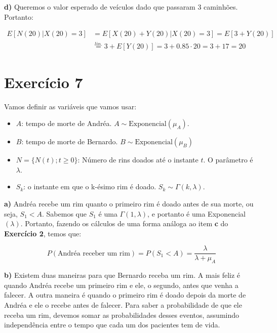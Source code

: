 \documentclass[12pt]{article}
\begin{document}
	 \textbf{d)} Queremos o valor esperado de veículos dado que passaram 3 caminhões. Portanto:
	 
	 \begin{equation*}
		 \begin{split}
			 E[N(20) | X(20) = 3] & = E[X(20) + Y(20) | X(20) = 3] = E[3 + Y(20)] \\
			 & \stackrel{lin.}{=} 3 + E[Y(20)] = 3 + 0.85 \cdot 20 = 3 + 17 = 20
		 \end{split}
	 \end{equation*}
	 
	 \section*{Exercício 7}
	 
	 Vamos definir as variáveis que vamos usar:
	 
	 \begin{itemize}
	 	\item $ A $: tempo de morte de Andréa. $A \sim \text{Exponencial}(\mu_A)$.
	 	\item $ B $: tempo de morte de Bernardo. $B \sim \text{Exponencial}(\mu_B)$
	 	\item $ N = \{N(t); t\geq0\}$: Número de rins doados até o instante $ t $. O parâmetro é $ \lambda $.
	 	\item $ S_k $: o instante em que o k-ésimo rim é doado. $S_k \sim \Gamma(k, \lambda)$.
	 \end{itemize}
	 
	 \textbf{a)} Andréa recebe um rim quanto o primeiro rim é doado antes de sua morte, ou seja, $ S_1 < A $. Sabemos que $ S_1 $ é uma $ \Gamma(1, \lambda) $, e portanto é uma Exponencial$ (\lambda) $. Portanto, fazendo os cálculos de uma forma análoga ao item \textbf{c} do \textbf{Exercício 2}, temos que:
	 
	 \begin{equation*}
	 	P(\text{Andréa receber um rim}) = P(S_1 < A) = \frac{\lambda}{\lambda + \mu_A}
	 \end{equation*}
	 
	 \textbf{b)} Existem duas maneiras para que Bernardo receba um rim. A mais feliz é quando Andréa recebe um primeiro rim e ele, o segundo, antes que venha a falecer. A outra maneira é quando o primeiro rim é doado depois da morte de Andréa e ele o recebe antes de falecer. Para saber a probabilidade de que ele receba um rim, devemos somar as probabilidades desses eventos, assumindo independência entre o tempo que cada um dos pacientes tem de vida.
	 
\end{document}
